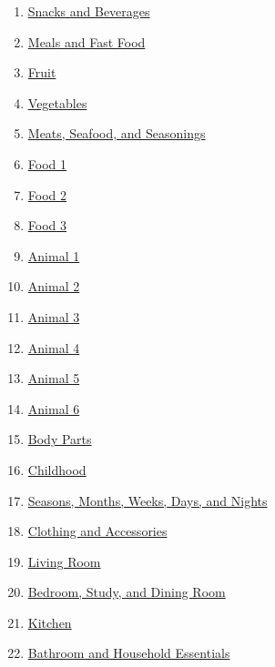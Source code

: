 \documentclass[11pt]{article}
\begin{document}
\begin{multicols}{2}
	\begin{enumerate}
		\item \href{https://mp.weixin.qq.com/s/nEADBxRAMJ0ccC1ZeX7osQ}{Snacks and Beverages}	%
		\item \href{https://mp.weixin.qq.com/s/yxLoq3mdp4XUt2uGWd7qWA}{Meals and Fast Food}	%
		\item \href{https://mp.weixin.qq.com/s/tYUBuyM_E--bvkUybuZvLA}{Fruit}	%
		\item \href{https://mp.weixin.qq.com/s/0IHr2bH871XEhwH5Wlwyfw}{Vegetables}	%
		\item \href{https://mp.weixin.qq.com/s/uKvYB6B0io3Elkizy4mXqA}{Meats, Seafood, and Seasonings}	%
		\item \href{https://mp.weixin.qq.com/s/Sxvx6nfiKx3UULZ8Z3ITCA}{Food 1}	%
		\item \href{https://mp.weixin.qq.com/s/U1kLaTyPAFkKRujf_HUCfg}{Food 2}	%
		\item \href{https://mp.weixin.qq.com/s/fcd3ACIR563NFDijNV34Tw}{Food 3}	%
		\item \href{https://mp.weixin.qq.com/s/MRuAfYlwWGfLw__6d7nGiA}{Animal 1}	%
		\item \href{https://mp.weixin.qq.com/s/FKjqkM4ALm5UxyBqV_XI8Q}{Animal 2}	%
		\item \href{https://mp.weixin.qq.com/s/PBi0xO5YjWB8PUtynFoPUw}{Animal 3}	%
		\item \href{https://mp.weixin.qq.com/s/KfIHaffiF4nJ-9q6vezwYQ}{Animal 4}	%
		\item \href{https://mp.weixin.qq.com/s/h2jS5DJRRNhFKc8yP6-OIw}{Animal 5}	%
		\item \href{https://mp.weixin.qq.com/s/hZVICSXpHMmFX6jNKyP3ZQ}{Animal 6}	%
		\item \href{https://mp.weixin.qq.com/s/PWQuGeXPwWA4axbw7Xr0Sw}{Body Parts}	%
		\item \href{https://mp.weixin.qq.com/s/7z2DBGF9_EXa2yRsqkZuAQ}{Childhood}	%
		\item \href{https://mp.weixin.qq.com/s/6BeSlu0uq1VJgeohKwoutg}{Seasons, Months, Weeks, Days, and Nights}	%
		\item \href{https://mp.weixin.qq.com/s/ZNST9qwtQheOnjgbJy0iyA}{Clothing and Accessories}	%
		\item \href{https://mp.weixin.qq.com/s/JiWc1_odBlNJaexwyIElHA}{Living Room}	%
		\item \href{https://mp.weixin.qq.com/s/gmoR_DU1W5Bt63SCrP1hSg}{Bedroom, Study, and Dining Room}	%
		\item \href{https://mp.weixin.qq.com/s/0grzc6jZadXCQ9QQJzZ_pg}{Kitchen}	%
		\item \href{https://mp.weixin.qq.com/s/gByL9EePUoI2-Yn8e1562g}{Bathroom and Household Essentials}	%
	\end{enumerate}
\end{multicols}
\end{document}
